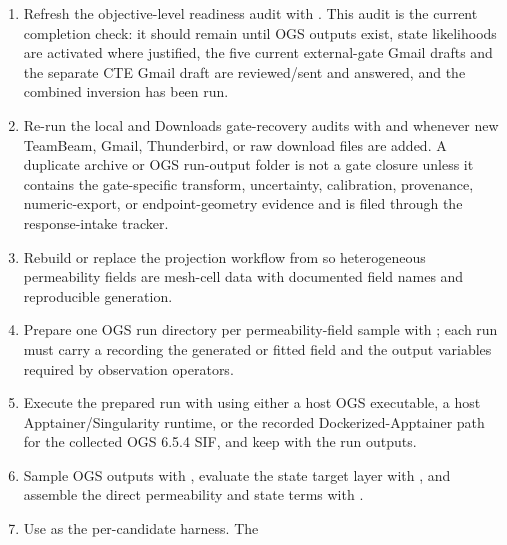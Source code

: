 \begin{enumerate}[leftmargin=1.5em]
  , or use the same
  gate through .  A failed release gate should
  stop candidate ranking because the run no longer represents the documented
  permeability-only stage.
  \item Refresh the objective-level readiness audit with
  .  This audit
  is the current completion check: it should remain  until OGS
  outputs exist, state likelihoods are activated where justified, the five current
  external-gate Gmail drafts and the separate CTE Gmail draft are reviewed/sent and
  answered, and the combined inversion has been run.
  \item Re-run the local and Downloads gate-recovery audits with
   and
   whenever
  new TeamBeam, Gmail, Thunderbird, or raw download files are added.  A duplicate
  archive or OGS run-output folder is not a gate closure unless it contains the
  gate-specific transform, uncertainty, calibration, provenance, numeric-export, or
  endpoint-geometry evidence and is filed through the response-intake tracker.
  \item Rebuild or replace the projection workflow from
   so heterogeneous permeability fields are
  mesh-cell data with documented field names and reproducible generation.
  \item Prepare one OGS run directory per permeability-field sample with
  ; each run must carry a
   recording the generated or fitted field and the output
  variables required by observation operators.
  \item Execute the prepared run with 
  using either a host OGS executable, a host Apptainer/Singularity runtime, or the
  recorded Dockerized-Apptainer path for the collected OGS 6.5.4 SIF, and keep
   with the run outputs.
  \item Sample OGS outputs with , evaluate the
  state target layer with , and assemble
  the direct permeability and state terms with .
  \item Use  as the per-candidate harness.  The

\end{enumerate}
